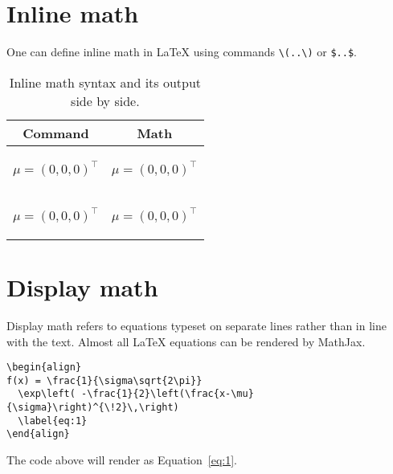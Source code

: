 \section{Inline math}
One can define inline math in LaTeX using commands \verb|\(..\)| or \verb|$..$|.
\begin{table}[htbp]
  \centering
  \begin{tabular}{| c | c |}
  \hline
  Command & Math\\
    \hline
    \begin{minipage}{0.45\textwidth}
\vspace{1mm}
\begin{example}
\(\mu = (0,0,0)^\top \)
\end{example}
    \end{minipage} &
    \begin{minipage}{0.45\textwidth}
    \centering
    \( \mu = (0,0,0)^\top \)
    \end{minipage}\\
    \hline
    
  \begin{minipage}{0.45\textwidth}
\vspace{1mm}
\begin{example}
$\mu = (0,0,0)^\top $
\end{example}
    \end{minipage} &
    \begin{minipage}{0.45\textwidth}
    \centering
    $ \mu = (0,0,0)^\top $
    \end{minipage}\\
    \hline
  \end{tabular}
  \caption{Inline math syntax and its output side by side.}
  \label{table:1}
\end{table}



\section{Display math}

Display math refers to equations typeset on separate lines rather than in line with the text. Almost all LaTeX equations can be rendered by
MathJax.

\begin{verbatim}
\begin{align}
f(x) = \frac{1}{\sigma\sqrt{2\pi}} 
  \exp\left( -\frac{1}{2}\left(\frac{x-\mu}{\sigma}\right)^{\!2}\,\right)
  \label{eq:1}
\end{align}
\end{verbatim}
The code above will render as Equation~\ref{eq:1}.

